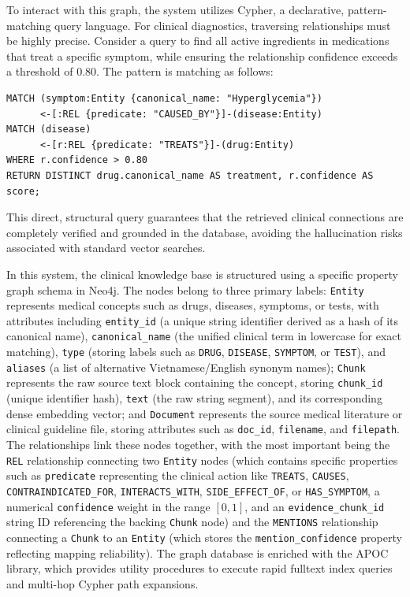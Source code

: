 \documentclass[../main.tex]{subfiles}
\begin{document}
To interact with this graph, the system utilizes Cypher, a declarative, pattern-matching query language. For clinical diagnostics, traversing relationships must be highly precise. Consider a query to find all active ingredients in medications that treat a specific symptom, while ensuring the relationship confidence exceeds a threshold of $0.80$. The pattern is matching as follows:

\begin{lstlisting}[basicstyle=\footnotesize\ttfamily,breaklines=true,columns=fullflexible]
MATCH (symptom:Entity {canonical_name: "Hyperglycemia"})
      <-[:REL {predicate: "CAUSED_BY"}]-(disease:Entity)
MATCH (disease)
      <-[r:REL {predicate: "TREATS"}]-(drug:Entity)
WHERE r.confidence > 0.80
RETURN DISTINCT drug.canonical_name AS treatment, r.confidence AS score;
\end{lstlisting}

This direct, structural query guarantees that the retrieved clinical connections are completely verified and grounded in the database, avoiding the hallucination risks associated with standard vector searches.

In this system, the clinical knowledge base is structured using a specific property graph schema in Neo4j. The nodes belong to three primary labels: \texttt{Entity} represents medical concepts such as drugs, diseases, symptoms, or tests, with attributes including \texttt{entity\_id} (a unique string identifier derived as a hash of its canonical name), \texttt{canonical\_name} (the unified clinical term in lowercase for exact matching), \texttt{type} (storing labels such as \texttt{DRUG}, \texttt{DISEASE}, \texttt{SYMPTOM}, or \texttt{TEST}), and \texttt{aliases} (a list of alternative Vietnamese/English synonym names); \texttt{Chunk} represents the raw source text block containing the concept, storing \texttt{chunk\_id} (unique identifier hash), \texttt{text} (the raw string segment), and its corresponding dense embedding vector; and \texttt{Document} represents the source medical literature or clinical guideline file, storing attributes such as \texttt{doc\_id}, \texttt{filename}, and \texttt{filepath}. The relationships link these nodes together, with the most important being the \texttt{REL} relationship connecting two \texttt{Entity} nodes (which contains specific properties such as \texttt{predicate} representing the clinical action like \texttt{TREATS}, \texttt{CAUSES}, \texttt{CONTRAINDICATED\_FOR}, \texttt{INTERACTS\_WITH}, \texttt{SIDE\_EFFECT\_OF}, or \texttt{HAS\_SYMPTOM}, a numerical \texttt{confidence} weight in the range $[0, 1]$, and an \texttt{evidence\_chunk\_id} string ID referencing the backing \texttt{Chunk} node) and the \texttt{MENTIONS} relationship connecting a \texttt{Chunk} to an \texttt{Entity} (which stores the \texttt{mention\_confidence} property reflecting mapping reliability). The graph database is enriched with the APOC library, which provides utility procedures to execute rapid fulltext index queries and multi-hop Cypher path expansions.
\end{document}
